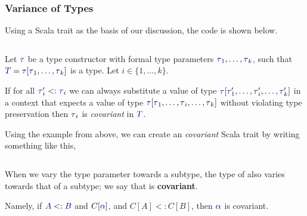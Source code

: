 \subsubsection{Variance of Types}\label{subsubsec:Type_Variance}
Using a \texttt{} Scala trait as the basis of our discussion, the code is shown below.
\inputminted[frame=lines,linenos]{scala}{./EDAP05-Concepts_Programming_Languages-Sections/Advanced_Data_Types/Code/Box.scala}

\begin{definition}[Covariance]\label{def:Type_Covariance}
  Let $\DataType$ be a type constructor with formal type parameters $\DataType_{1}, \ldots , \DataType_{k}$, such that $\SemanticType{T} = \DataType [\DataType_{1}, \ldots, \DataType_{k}]$ is a type.
  Let $i \in \lbrace 1,\ldots, k \rbrace$.

  If for all $\DataType_{i}' <: \DataType_{i}$ we can always substitute a value of type $\DataType [\DataType_{1}',\ldots, \DataType_{i}', \ldots, \DataType_{k}']$ in a context that expects a value of type $\DataType [\DataType_{1}, \ldots, \DataType_{i}, \ldots, \DataType_{k}]$ without violating type preservation then $\DataType_{i}$ is \emph{covariant} in $\SemanticType{T}$.

  Using the  example from above, we can create an \emph{covariant} Scala trait by writing something like this,
  \inputminted[frame=lines,linenos]{scala}{./EDAP05-Concepts_Programming_Languages-Sections/Advanced_Data_Types/Code/CovariantBox.scala}
  When we vary the type parameter  towards a subtype, the type of  also varies towards that of a subtype; we say that  is \textbf{covariant}.

  Namely, if $\SemanticType{A} <: \SemanticType{B}$ and $C[\SemanticType{\alpha}]$, and $C[A] <: C[B]$, then $\SemanticType{\alpha}$ is covariant.
\end{definition}

